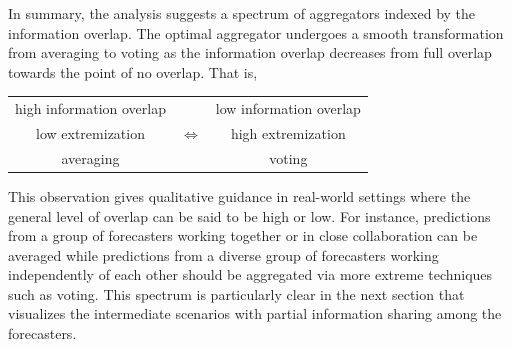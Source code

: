 \documentclass[11pt]{article}
\newtheorem{observation}[theorem]{Observation}
\newtheorem{proposition}[theorem]{Proposition}
\theoremstyle{definition}
\theoremstyle{definition}
\begin{document}
In summary, the analysis suggests a spectrum of aggregators indexed by
the information overlap.  The optimal aggregator undergoes a smooth
transformation from averaging to voting as
the information overlap decreases from full overlap towards the point
of no overlap.
That is,
\begin{center}
\begin{tabular}{ccc}
high information overlap & & low information overlap\\
low extremization & {\Large $\Longleftrightarrow$} & high extremization \\
averaging  & & voting\\
\end{tabular}
\end{center}
This observation gives qualitative guidance in real-world settings
where the general level of overlap can be said to be high or low.  For
instance, predictions from a group of forecasters working together or in
close collaboration can be averaged while predictions from a diverse
group of forecasters working independently of each other should be
aggregated via more extreme techniques such as voting. This spectrum is particularly clear in the next section
that visualizes the intermediate scenarios with partial information
sharing among the forecasters.

%
\end{document}
